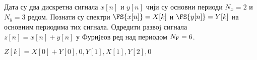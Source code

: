 \PID 
Дата су два дискретна сигнала $x[n]$ и $y[n]$ чији су основни периоди $N_x = 2$ и $N_y = 3$ редом. Познати су спектри
$\FS{x[n]} = X[k]$ и $\FS{y[n]} = Y [k]$ на основним периодима тих сигнала. Одредити развоj сигнала $z[n] = x[n] + y[n]$
у Фуриjеов ред над периодом $N_{\rm F} = 6$.
\vspace*{2mm}

\textsc{}
$Z[k] = {X[0] + Y [0], 0, Y [1], X[1], Y [2], 0}$